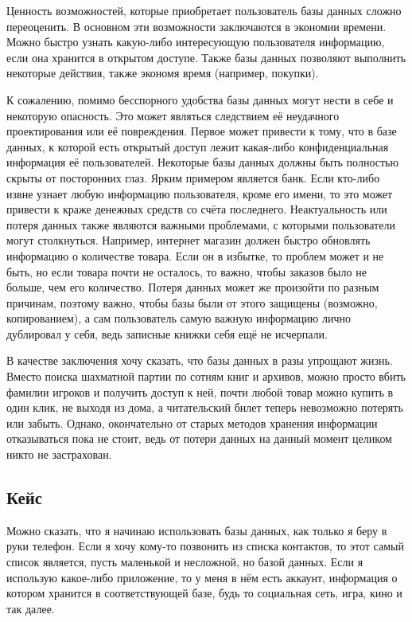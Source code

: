 \documentclass[14pt]{extreport}
\begin{document}
Ценность возможностей, которые приобретает пользователь базы данных сложно переоценить. В основном эти возможности заключаются в экономии времени. Можно быстро узнать какую-либо интересующую пользователя информацию, если она хранится в открытом доступе. Также базы данных позволяют выполнить некоторые действия, также экономя время (например, покупки).

К сожалению, помимо бесспорного удобства базы данных могут нести в себе и некоторую опасность. Это может являться следствием её неудачного проектирования или её повреждения. Первое может привести к тому, что в базе данных, к которой есть открытый доступ лежит какая-либо конфиденциальная информация её пользователей. Некоторые базы данных должны быть полностью скрыты от посторонних глаз. Ярким примером является банк. Если кто-либо извне узнает любую информацию пользователя, кроме его имени, то это может привести к краже денежных средств со счёта последнего. Неактуальность или потеря данных также являются важными проблемами, с которыми пользователи могут столкнуться. Например, интернет магазин должен быстро обновлять информацию о количестве товара. Если он в избытке, то проблем может и не быть, но если товара почти не осталось, то важно, чтобы заказов было не больше, чем его количество. Потеря данных может же произойти по разным причинам, поэтому важно, чтобы базы были от этого защищены (возможно, копированием), а сам пользователь самую важную информацию лично дублировал у себя, ведь записные книжки себя ещё не исчерпали.

В качестве заключения хочу сказать, что базы данных в разы упрощают жизнь. Вместо поиска шахматной партии по сотням книг и архивов, можно просто вбить фамилии игроков и получить доступ к ней, почти любой товар можно купить в один клик, не выходя из дома, а читательский билет теперь невозможно потерять или забыть. Однако, окончательно от старых методов хранения информации отказываться пока не стоит, ведь от потери данных на данный момент целиком никто не застрахован.

\subsection{Кейс}

Можно сказать, что я начинаю использовать базы данных, как только я беру в руки телефон. Если я хочу кому-то позвонить из списка контактов, то этот самый список является, пусть маленькой и несложной, но базой данных. Если я использую какое-либо приложение, то у меня в нём есть аккаунт, информация о котором хранится в соответствующей базе, будь то социальная сеть, игра, кино и так далее.
\end{document}
